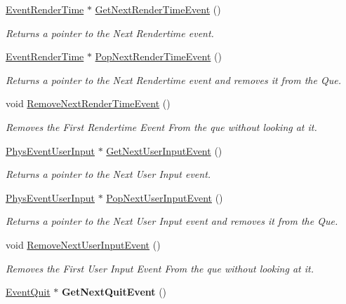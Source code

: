 \begin{DoxyCompactItemize}
\item 
\hyperlink{classphys_1_1EventRenderTime}{EventRenderTime} $\ast$ \hyperlink{classPhysEventManager_ae1276d993b2892048341205ae0e8de02}{GetNextRenderTimeEvent} ()
\begin{DoxyCompactList}\small\item\em Returns a pointer to the Next Rendertime event. \item\end{DoxyCompactList}\item 
\hyperlink{classphys_1_1EventRenderTime}{EventRenderTime} $\ast$ \hyperlink{classPhysEventManager_a682d25bedcbbf2c66bd8c067e67ee7f5}{PopNextRenderTimeEvent} ()
\begin{DoxyCompactList}\small\item\em Returns a pointer to the Next Rendertime event and removes it from the Que. \item\end{DoxyCompactList}\item 
void \hyperlink{classPhysEventManager_a56acc075e743921e27284c023b3298ce}{RemoveNextRenderTimeEvent} ()
\begin{DoxyCompactList}\small\item\em Removes the First Rendertime Event From the que without looking at it. \item\end{DoxyCompactList}\item 
\hyperlink{classPhysEventUserInput}{PhysEventUserInput} $\ast$ \hyperlink{classPhysEventManager_a4874a9b1138d2351bf28e527a66c02b8}{GetNextUserInputEvent} ()
\begin{DoxyCompactList}\small\item\em Returns a pointer to the Next User Input event. \item\end{DoxyCompactList}\item 
\hyperlink{classPhysEventUserInput}{PhysEventUserInput} $\ast$ \hyperlink{classPhysEventManager_ad6612a6e1c728941e2c467e7f136ca51}{PopNextUserInputEvent} ()
\begin{DoxyCompactList}\small\item\em Returns a pointer to the Next User Input event and removes it from the Que. \item\end{DoxyCompactList}\item 
void \hyperlink{classPhysEventManager_a9c6f5296c9961fa469ebe06d7599283a}{RemoveNextUserInputEvent} ()
\begin{DoxyCompactList}\small\item\em Removes the First User Input Event From the que without looking at it. \item\end{DoxyCompactList}\item 
\hypertarget{classPhysEventManager_a61aa2ee266536d45fec2be0487f77940}{
\hyperlink{classphys_1_1EventQuit}{EventQuit} $\ast$ {\bfseries GetNextQuitEvent} ()}
\label{d5/dd7/classPhysEventManager_a61aa2ee266536d45fec2be0487f77940}


\end{DoxyCompactItemize}
